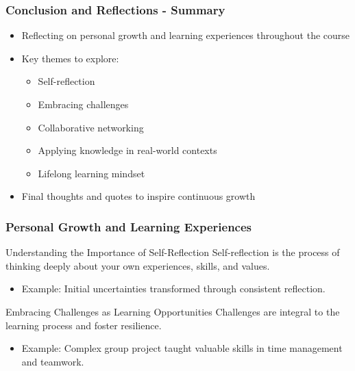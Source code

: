 \documentclass[aspectratio=169]{beamer}
\begin{document}
\begin{frame}[fragile]
    \frametitle{Conclusion and Reflections - Summary}
    \begin{itemize}
        \item Reflecting on personal growth and learning experiences throughout the course
        \item Key themes to explore:
        \begin{itemize}
            \item Self-reflection
            \item Embracing challenges
            \item Collaborative networking
            \item Applying knowledge in real-world contexts
            \item Lifelong learning mindset
        \end{itemize}
        \item Final thoughts and quotes to inspire continuous growth
    \end{itemize}
\end{frame}

\begin{frame}[fragile]
    \frametitle{Personal Growth and Learning Experiences}
    \begin{block}{Understanding the Importance of Self-Reflection}
        Self-reflection is the process of thinking deeply about your own experiences, skills, and values.
    \end{block}
    \begin{itemize}
        \item Example: Initial uncertainties transformed through consistent reflection.
    \end{itemize}
    
    \begin{block}{Embracing Challenges as Learning Opportunities}
        Challenges are integral to the learning process and foster resilience.
    \end{block}
    \begin{itemize}
        \item Example: Complex group project taught valuable skills in time management and teamwork.
    \end{itemize}
\end{frame}
\end{document}
